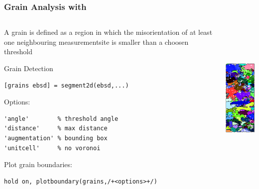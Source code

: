 \begin{frame}[fragile]
  \frametitle{Grain Analysis with \mtex}



  \begin{columns}
    \begin{column}{8.5cm}

      A grain is defined as a region in which the mis\-orien\-tation of
      at least one neigh\-bour\-ing meas\-ure\-ment\-site is smaller than a choosen threshold

\medskip

      Grain Detection

\begin{lstlisting}
[grains ebsd] = segment2d(ebsd,...)
\end{lstlisting}

      \medskip
      Options:
\begin{lstlisting}
'angle'        % threshold angle
'distance'     % max distance
'augmentation' % bounding box
'unitcell'     % no voronoi
\end{lstlisting}

\medskip

Plot grain boundaries:
\begin{lstlisting}
hold on, plotboundary(grains,/+<options>+/)
\end{lstlisting}

\end{column}
    \begin{column}{3.5cm}
      \includegraphics[height=7.5cm]{pic/ebsdgrains}
    \end{column}
  \end{columns}

\end{frame}


